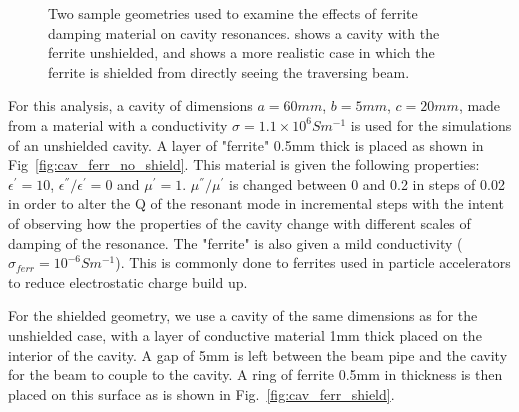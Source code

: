 \begin{figure}
\caption{Two sample geometries used to examine the effects of ferrite damping material on cavity resonances.  shows a cavity with the ferrite unshielded, and  shows a more realistic case in which the ferrite is shielded from directly seeing the traversing beam.}
\label{fig:ferr_cav_res}
\end{figure}

For this analysis, a cavity of dimensions $a=60mm$, $b=5mm$, $c=20mm$, made from a material with a conductivity $\sigma = 1.1 \times 10^{6} S m^{-1}$ is used for the simulations of an unshielded cavity. A layer of "ferrite" 0.5mm thick is placed as shown in Fig~\ref{fig:cav_ferr_no_shield}. This material is given the following properties: $\epsilon^{'} = 10$, $\epsilon^{''}/\epsilon^{'} = 0$ and $\mu^{'}=1$. $\mu^{''}/ \mu^{'}$ is changed between 0 and 0.2 in steps of 0.02 in order to alter the Q of the resonant mode in incremental steps with the intent of observing how the properties of the cavity change with different scales of damping of the resonance. The "ferrite" is also given a mild conductivity ($\sigma_{ferr} = 10^{-6} S m^{-1}$). This is commonly done to ferrites used in particle accelerators to reduce electrostatic charge build up. 

For the shielded geometry, we use a cavity of the same dimensions as for the unshielded case, with a layer of conductive material 1mm thick placed on the interior of the cavity. A gap of 5mm is left between the beam pipe and the cavity for the beam to couple to the cavity. A ring of ferrite 0.5mm in thickness is then placed on this surface as is shown in Fig.~\ref{fig:cav_ferr_shield}.

